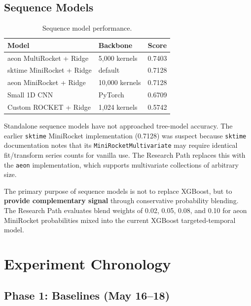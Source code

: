 \documentclass[12pt, a4paper]{article}
\begin{document}
\subsection{Sequence Models}

\begin{table}[h]
\centering
\caption{Sequence model performance.}
\label{tab:seq_models}
\begin{tabular}{@{}llc@{}}
\toprule
\textbf{Model} & \textbf{Backbone} & \textbf{Score} \\ \midrule
aeon MultiRocket + Ridge & 5{,}000 kernels & 0.7403 \\
sktime MiniRocket + Ridge & default & 0.7128 \\
aeon MiniRocket + Ridge & 10{,}000 kernels & 0.7128 \\
Small 1D CNN & PyTorch & 0.6709 \\
Custom ROCKET + Ridge & 1{,}024 kernels & 0.5742 \\ \bottomrule
\end{tabular}
\end{table}

Standalone sequence models have not approached tree-model accuracy. The earlier \texttt{sktime} MiniRocket implementation (0.7128) was suspect because \texttt{sktime} documentation notes that its \texttt{MiniRocketMultivariate} may require identical fit/transform series counts for vanilla use. The Research Path replaces this with the \texttt{aeon} implementation, which supports multivariate collections of arbitrary size.

The primary purpose of sequence models is not to replace XGBoost, but to \textbf{provide complementary signal} through conservative probability blending. The Research Path evaluates blend weights of 0.02, 0.05, 0.08, and 0.10 for aeon MiniRocket probabilities mixed into the current XGBoost targeted-temporal model.

\section{Experiment Chronology}

\subsection{Phase 1: Baselines (May 16--18)}
\end{document}
